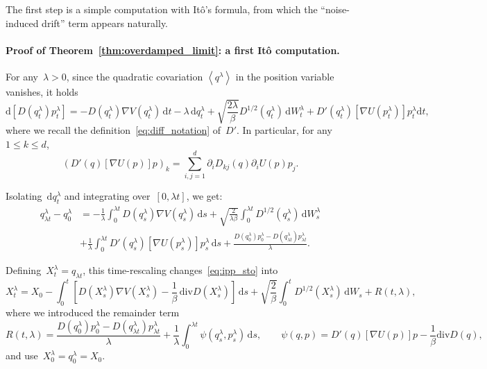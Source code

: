 \documentclass[10pt]{article}
\renewcommand{\d}{\mathrm{d}}
\newcommand{\1}{\mathbbm 1}
\begin{document}
The first step is a simple computation with It\^o's formula, from which the ``noise-induced drift'' term appears naturally.
\paragraph{Proof of Theorem~\ref{thm:overdamped_limit}: a first It\^o computation.}
For any~$\lambda>0$, since the quadratic covariation $\left\langle q^\lambda\right\rangle$ in the position variable vanishes, it holds
\begin{equation}
    \d\left[D(q_t^\lambda)p_t^\lambda\right] = -D(q_t^\lambda)\nabla V(q_t^\lambda)\,\d t - \lambda\,\d q_t^\lambda + \sqrt{\frac{2\lambda}{\beta}}D^{1/2}(q_t^\lambda)\,\d W_t^\lambda + D'(q_t^\lambda)\left[\nabla U(p_t^\lambda)\right]p_t^\lambda\d t,
\end{equation}
where we recall the definition~\eqref{eq:diff_notation} of~$D'$. In particular, for any~${1\leq k\leq d}$,
\begin{equation}
    \label{eq:drift_term}
    \left(D'(q)\left[\nabla U(p)\right]p \right)_k = \sum_{i,j=1}^d \partial_i D_{kj}(q)\partial_i U(p)p_j.
\end{equation}

Isolating~$\d q_t^\lambda$ and integrating over~$[0,\lambda t]$, we get:
    \begin{equation}
        \label{eq:ipp_sto}
        \begin{aligned}
        q_{\lambda t}^\lambda- q_0^\lambda &= -\frac{1}{\lambda}\int_0^{\lambda t}D(q_s^\lambda)\nabla V(q_s^\lambda)\,\d s+ \sqrt{\frac{2}{\lambda\beta}}\int_0^{\lambda t}D^{1/2}(q_s^\lambda)\,\d W_s^\lambda\\
        &+ \frac{1}{\lambda}\int_0^{\lambda t}D'(q_s^\lambda)\left[\nabla U(p_s^\lambda)\right]p_s^\lambda\,\d s+\frac{D(q_0^\lambda)p_0^\lambda - D(q_{\lambda t}^\lambda)p_{\lambda t}^\lambda}{\lambda}.
        \end{aligned}
    \end{equation}

Defining~$X^\lambda_t = q_{\lambda t}$, this time-rescaling changes~\eqref{eq:ipp_sto} into
\begin{equation}
    \label{eq:perturbed_overdamped}
    X_t^\lambda = X_0 -\int_0^t \left[D(X_s^\lambda)\nabla V(X_s^\lambda)-\frac1\beta\,\mathrm{div} D(X_s^\lambda)\right]\,\d s + \sqrt{\frac{2}{\beta}}\int_0^t D^{1/2}(X_s^\lambda)\,\d W_s + R(t,\lambda),
\end{equation}
where we introduced the remainder term
\begin{equation}
    \label{eq:remainder}
    R(t,\lambda) = \frac{D(q_0^\lambda)p_0^\lambda-D(q_{\lambda t}^\lambda)p_{\lambda t}^\lambda}{\lambda} + \frac1\lambda\int_0^{\lambda t} \psi(q_s^\lambda,p_{s}^\lambda)\,\d s,\qquad \psi(q,p) = D'(q)\left[\nabla U(p)\right] p - \frac1\beta \mathrm{div} D(q),
\end{equation}
and use~$X_0^\lambda=q_0^\lambda=X_0$.
\end{document}
